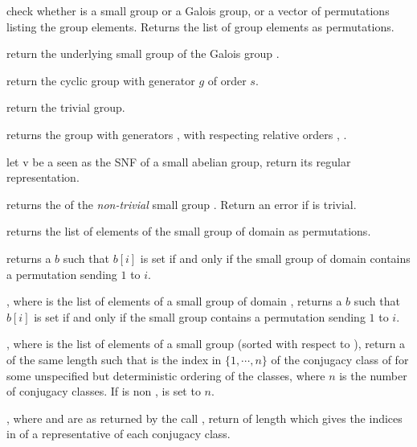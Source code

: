 check whether  is a small group or a Galois group, or a vector of
permutations listing the group elements. Returns the list of group elements as
permutations.

 return the underlying small group of the
Galois group .

 return the cyclic group with generator
$g$ of order $s$.

 return the trivial group.

 returns the group
with generators ,  with respecting relative orders ,
.

 let v be a  seen as the SNF of
a small abelian group, return its regular representation.

 returns the  of the
\emph{non-trivial} small group . Return an error if  is
trivial.

 returns the list of elements of the
small group  of domain  as permutations.

 returns a  $b$ such that
$b[i]$ is set if and only if the small group  of domain 
contains a permutation sending $1$ to $i$.

, where  is the list of
elements of a small group of domain , returns a  $b$ such that
$b[i]$ is set if and only if the small group contains a permutation sending $1$
to $i$.

, where  is
the list of elements of a small group (sorted with respect to
), return a   of
the same length such that  is the index in $\{1,\cdots,n\}$  of
the conjugacy class of  for some unspecified but deterministic
ordering of the classes, where $n$ is the number of conjugacy classes. If
 is non ,  is set to $n$.

,
where  and  are as returned by the call
, return  of length 
which gives the indices in  of a representative of each conjugacy
class.

